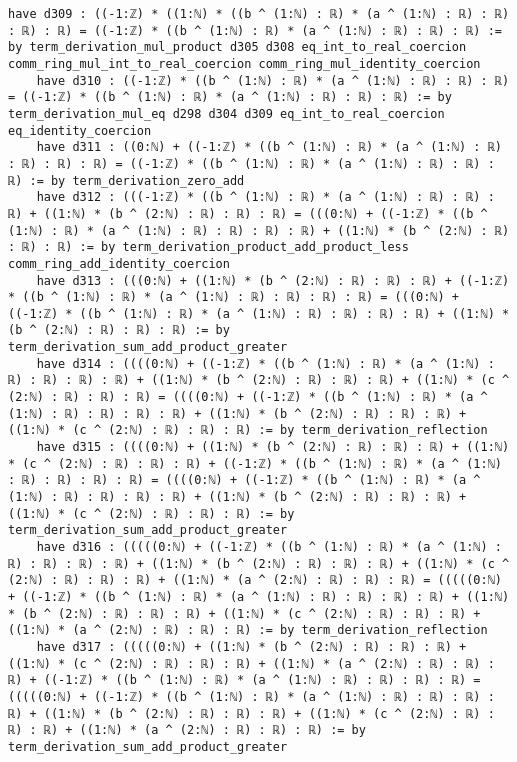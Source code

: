 \documentclass{article}
\begin{document}
\begin{tcolorbox}[colback=white!10, width=\linewidth]
\begin{lstlisting}[language=Lean4]
    have d309 : ((-1:ℤ) * ((1:ℕ) * ((b ^ (1:ℕ) : ℝ) * (a ^ (1:ℕ) : ℝ) : ℝ) : ℝ) : ℝ) = ((-1:ℤ) * ((b ^ (1:ℕ) : ℝ) * (a ^ (1:ℕ) : ℝ) : ℝ) : ℝ) := by term_derivation_mul_product d305 d308 eq_int_to_real_coercion comm_ring_mul_int_to_real_coercion comm_ring_mul_identity_coercion
    have d310 : ((-1:ℤ) * ((b ^ (1:ℕ) : ℝ) * (a ^ (1:ℕ) : ℝ) : ℝ) : ℝ) = ((-1:ℤ) * ((b ^ (1:ℕ) : ℝ) * (a ^ (1:ℕ) : ℝ) : ℝ) : ℝ) := by term_derivation_mul_eq d298 d304 d309 eq_int_to_real_coercion eq_identity_coercion
    have d311 : ((0:ℕ) + ((-1:ℤ) * ((b ^ (1:ℕ) : ℝ) * (a ^ (1:ℕ) : ℝ) : ℝ) : ℝ) : ℝ) = ((-1:ℤ) * ((b ^ (1:ℕ) : ℝ) * (a ^ (1:ℕ) : ℝ) : ℝ) : ℝ) := by term_derivation_zero_add
    have d312 : (((-1:ℤ) * ((b ^ (1:ℕ) : ℝ) * (a ^ (1:ℕ) : ℝ) : ℝ) : ℝ) + ((1:ℕ) * (b ^ (2:ℕ) : ℝ) : ℝ) : ℝ) = (((0:ℕ) + ((-1:ℤ) * ((b ^ (1:ℕ) : ℝ) * (a ^ (1:ℕ) : ℝ) : ℝ) : ℝ) : ℝ) + ((1:ℕ) * (b ^ (2:ℕ) : ℝ) : ℝ) : ℝ) := by term_derivation_product_add_product_less comm_ring_add_identity_coercion
    have d313 : (((0:ℕ) + ((1:ℕ) * (b ^ (2:ℕ) : ℝ) : ℝ) : ℝ) + ((-1:ℤ) * ((b ^ (1:ℕ) : ℝ) * (a ^ (1:ℕ) : ℝ) : ℝ) : ℝ) : ℝ) = (((0:ℕ) + ((-1:ℤ) * ((b ^ (1:ℕ) : ℝ) * (a ^ (1:ℕ) : ℝ) : ℝ) : ℝ) : ℝ) + ((1:ℕ) * (b ^ (2:ℕ) : ℝ) : ℝ) : ℝ) := by term_derivation_sum_add_product_greater
    have d314 : ((((0:ℕ) + ((-1:ℤ) * ((b ^ (1:ℕ) : ℝ) * (a ^ (1:ℕ) : ℝ) : ℝ) : ℝ) : ℝ) + ((1:ℕ) * (b ^ (2:ℕ) : ℝ) : ℝ) : ℝ) + ((1:ℕ) * (c ^ (2:ℕ) : ℝ) : ℝ) : ℝ) = ((((0:ℕ) + ((-1:ℤ) * ((b ^ (1:ℕ) : ℝ) * (a ^ (1:ℕ) : ℝ) : ℝ) : ℝ) : ℝ) + ((1:ℕ) * (b ^ (2:ℕ) : ℝ) : ℝ) : ℝ) + ((1:ℕ) * (c ^ (2:ℕ) : ℝ) : ℝ) : ℝ) := by term_derivation_reflection
    have d315 : ((((0:ℕ) + ((1:ℕ) * (b ^ (2:ℕ) : ℝ) : ℝ) : ℝ) + ((1:ℕ) * (c ^ (2:ℕ) : ℝ) : ℝ) : ℝ) + ((-1:ℤ) * ((b ^ (1:ℕ) : ℝ) * (a ^ (1:ℕ) : ℝ) : ℝ) : ℝ) : ℝ) = ((((0:ℕ) + ((-1:ℤ) * ((b ^ (1:ℕ) : ℝ) * (a ^ (1:ℕ) : ℝ) : ℝ) : ℝ) : ℝ) + ((1:ℕ) * (b ^ (2:ℕ) : ℝ) : ℝ) : ℝ) + ((1:ℕ) * (c ^ (2:ℕ) : ℝ) : ℝ) : ℝ) := by term_derivation_sum_add_product_greater
    have d316 : (((((0:ℕ) + ((-1:ℤ) * ((b ^ (1:ℕ) : ℝ) * (a ^ (1:ℕ) : ℝ) : ℝ) : ℝ) : ℝ) + ((1:ℕ) * (b ^ (2:ℕ) : ℝ) : ℝ) : ℝ) + ((1:ℕ) * (c ^ (2:ℕ) : ℝ) : ℝ) : ℝ) + ((1:ℕ) * (a ^ (2:ℕ) : ℝ) : ℝ) : ℝ) = (((((0:ℕ) + ((-1:ℤ) * ((b ^ (1:ℕ) : ℝ) * (a ^ (1:ℕ) : ℝ) : ℝ) : ℝ) : ℝ) + ((1:ℕ) * (b ^ (2:ℕ) : ℝ) : ℝ) : ℝ) + ((1:ℕ) * (c ^ (2:ℕ) : ℝ) : ℝ) : ℝ) + ((1:ℕ) * (a ^ (2:ℕ) : ℝ) : ℝ) : ℝ) := by term_derivation_reflection
    have d317 : (((((0:ℕ) + ((1:ℕ) * (b ^ (2:ℕ) : ℝ) : ℝ) : ℝ) + ((1:ℕ) * (c ^ (2:ℕ) : ℝ) : ℝ) : ℝ) + ((1:ℕ) * (a ^ (2:ℕ) : ℝ) : ℝ) : ℝ) + ((-1:ℤ) * ((b ^ (1:ℕ) : ℝ) * (a ^ (1:ℕ) : ℝ) : ℝ) : ℝ) : ℝ) = (((((0:ℕ) + ((-1:ℤ) * ((b ^ (1:ℕ) : ℝ) * (a ^ (1:ℕ) : ℝ) : ℝ) : ℝ) : ℝ) + ((1:ℕ) * (b ^ (2:ℕ) : ℝ) : ℝ) : ℝ) + ((1:ℕ) * (c ^ (2:ℕ) : ℝ) : ℝ) : ℝ) + ((1:ℕ) * (a ^ (2:ℕ) : ℝ) : ℝ) : ℝ) := by term_derivation_sum_add_product_greater

\end{lstlisting}
\end{tcolorbox}
\end{document}
